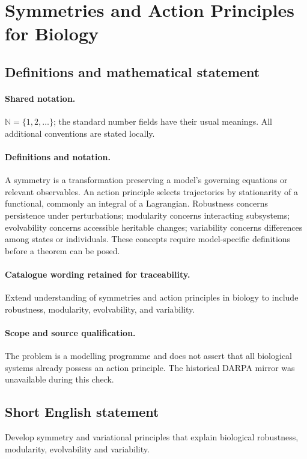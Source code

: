 \documentclass[11pt]{article}
\begin{document}
\section{Symmetries and Action Principles for Biology}\label{statement}

\subsection{Definitions and mathematical statement}

\paragraph{Shared notation.}$\mathbb N=\{1,2,\ldots\}$; the standard number fields have their usual meanings. All additional conventions are stated locally.


\paragraph{Definitions and notation.}A symmetry is a transformation preserving a model’s governing equations or relevant observables. An action principle selects trajectories by stationarity of a functional, commonly an integral of a Lagrangian. Robustness concerns persistence under perturbations; modularity concerns interacting subsystems; evolvability concerns accessible heritable changes; variability concerns differences among states or individuals. These concepts require model-specific definitions before a theorem can be posed.

\paragraph{Catalogue wording retained for traceability.}
Extend understanding of symmetries and action principles in biology to include robustness, modularity, evolvability, and variability.
\paragraph{Scope and source qualification.}The problem is a modelling programme and does not assert that all biological systems already possess an action principle. The historical DARPA mirror was unavailable during this check.
\subsection{Short English statement}
Develop symmetry and variational principles that explain biological robustness, modularity, evolvability and variability.
\end{document}
